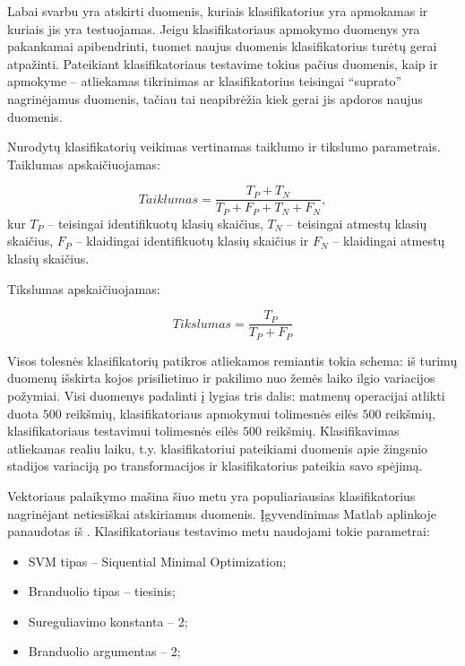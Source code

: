 \documentclass[]{vgtuef}
\begin{document}
Labai svarbu yra atskirti duomenis, kuriais klasifikatorius yra apmokamas ir kuriais jis yra testuojamas. Jeigu klasifikatoriaus apmokymo duomenys yra pakankamai apibendrinti, tuomet naujus duomenis klasifikatorius turėtų gerai atpažinti. Pateikiant klasifikatoriaus testavime tokius pačius duomenis, kaip ir apmokyme -- atliekamas tikrinimas ar klasifikatorius teisingai ``suprato'' nagrinėjamus duomenis, tačiau tai neapibrėžia kiek gerai jis apdoros naujus duomenis.

Nurodytų klasifikatorių veikimas vertinamas taiklumo ir tikslumo parametrais. Taiklumas apskaičiuojamas:

\begin{equation}
Taiklumas = \frac{T_P + T_N}{T_P + F_P + T_N + F_N},
\end{equation}
kur $T_P$ -- teisingai identifikuotų klasių skaičius, $T_N$ -- teisingai atmestų klasių skaičius, $F_P$ -- klaidingai identifikuotų klasių skaičius ir $F_N$ -- klaidingai atmestų klasių skaičius.

Tikslumas apskaičiuojamas:

\begin{equation}
Tikslumas = \frac{T_P}{T_P + F_P}
\end{equation}

Visos tolesnės klasifikatorių patikros atliekamos remiantis tokia schema: iš turimų duomenų išskirta kojos prisilietimo ir pakilimo nuo žemės laiko ilgio variacijos požymiai. Visi duomenys padalinti į lygias tris dalis: matmenų operacijai atlikti duota $500$ reikšmių, klasifikatoriaus apmokymui tolimesnės eilės $500$ reikšmių, klasifikatoriaus testavimui tolimesnės eilės $500$ reikšmių. Klasifikavimas atliekamas realiu laiku, t.y. klasifikatoriui pateikiami duomenis apie žingsnio stadijos variaciją po transformacijos ir klasifikatorius pateikia savo spėjimą.

Vektoriaus palaikymo mašina \cite{Burges98atutorial} šiuo metu yra populiariausias klasifikatorius nagrinėjant netiesiškai atskiriamus duomenis. Įgyvendinimas Matlab aplinkoje panaudotas iš \cite{website:svm_implementation}. Klasifikatoriaus testavimo metu naudojami tokie parametrai:

\begin{itemize}
\item SVM tipas -- Siquential Minimal Optimization;
\item Branduolio tipas -- tiesinis;
\item Sureguliavimo konstanta -- 2;
\item Branduolio argumentas -- 2;
\end{itemize}
\end{document}
